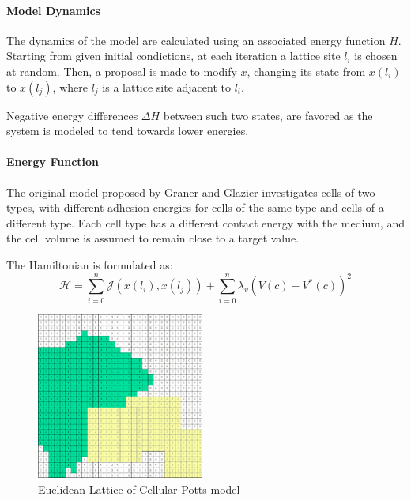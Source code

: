 \documentclass[a4paper,10pt,twocolumn]{article}
\begin{document}
        \paragraph{Model Dynamics}
        The dynamics of the model are calculated using an associated energy function $H$.
        Starting from given initial condictions, at each iteration a lattice site $l_i$ is chosen at random.
        Then, a proposal is made to modify $x$, changing its state from $x(l_i)$ to 
        $x(l_j)$, where $l_j$ is a lattice site adjacent to $l_i$.

        Negative energy differences $\Delta H$ between such two states,
        are favored as the system is modeled to tend towards lower energies.

        \paragraph{Energy Function}
        The original model proposed by Graner and Glazier\cite{cellular_potts} investigates cells of two types, 
        with different adhesion energies for cells of the same type and cells of a 
        different type. Each cell type has a different contact energy with the 
        medium, and the cell volume is assumed to remain close to a target value. 
        
        The Hamiltonian is formulated as:
        \begin{equation}
            \mathcal{H} = \sum_{i=0}^{n} \mathcal{J}(x(l_i), x(l_j)) + \sum_{i=0}^{n} \lambda_v {(V(c) - V^*(c))}^2
            \label{eq:hamiltonian}
        \end{equation}

        \begin{figure}[H]
            \centering
            \includegraphics[width=0.49\textwidth]{../images/cpm_lattice.png}
            \caption{Euclidean Lattice of Cellular Potts model}\label{fig:cpm}
        \end{figure}
\end{document}
